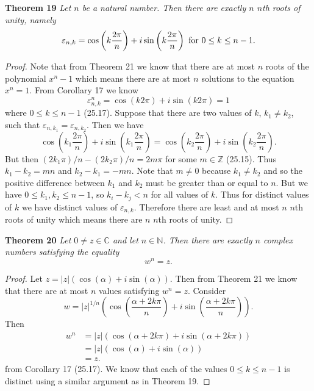 \documentclass{article}
\begin{document}
\begin{flushleft}
\textbf{Theorem 19}
\textsl{Let $n$ be a natural number. Then there are exactly $n$ $n$th roots of unity, namely
\[
\varepsilon_{n,k} = \cos \left ( k \frac{2 \pi}{n} \right ) + i \sin \left ( k \frac{2 \pi}{n} \right ) \textup{ for } 0 \leq k \leq n-1.
\]}
\begin{proof}
Note that from Theorem 21 we know that there are at most $n$ roots of the polynomial $x^n - 1$ which means there are at most $n$ solutions to the equation $x^n = 1$. From Corollary 17 we know
\[
\varepsilon_{n,k}^n = \cos \left ( k 2 \pi \right ) + i \sin \left ( k 2 \pi \right ) = 1
\]
where $0 \leq k \leq n-1$ (25.17). Suppose that there are two values of $k$, $k_1 \neq k_2$, such that $\varepsilon_{n,k_1} = \varepsilon_{n,k_2}$. Then we have
\[
\cos \left ( k_1 \frac{2 \pi}{n} \right ) + i \sin \left ( k_1 \frac{2 \pi}{n} \right ) = \cos \left ( k_2 \frac{2 \pi}{n} \right ) + i \sin \left ( k_2 \frac{2 \pi}{n} \right ).
\]
But then $(2 k_1 \pi)/n - (2 k_2 \pi)/n = 2 m \pi$ for some $m \in \mathbb{Z}$ (25.15). Thus $k_1 - k_2 = mn$ and $k_2 - k_1 = -mn$. Note that $m \neq 0$ because $k_1 \neq k_2$ and so the positive difference between $k_1$ and $k_2$ must be greater than or equal to $n$. But we have $0 \leq k_1, k_2 \leq n-1$, so $k_i - k_j < n$ for all values of $k$. Thus for distinct values of $k$ we have distinct values of $\varepsilon_{n,k}$. Therefore there are least and at most $n$ $n$th roots of unity which means there are $n$ $n$th roots of unity.
\end{proof}

\textbf{Theorem 20}
\textsl{Let $0 \neq z \in \mathbb{C}$ and let $n \in \mathbb{N}$. Then there are exactly $n$ complex numbers satisfying the equality
\[
w^n = z.
\]}
\begin{proof}
Let $z = |z| \left ( \cos \left (\alpha \right ) + i \sin \left ( \alpha \right ) \right )$. Then from Theorem 21 we know that there are at most $n$ values satisfying $w^n = z$. Consider
\[
w = |z|^{1/n} \left ( \cos \left ( \frac{\alpha + 2 k \pi}{n} \right ) + i \sin \left ( \frac{\alpha + 2 k \pi}{n} \right ) \right ).
\]
Then
\begin{align*}
w^n &= |z| \left ( \cos \left ( \alpha + 2k \pi \right ) + i \sin \left ( \alpha + 2k \pi \right ) \right )\\
	&= |z| \left ( \cos \left ( \alpha \right ) + i \sin \left ( \alpha \right ) \right ) \\
	&= z.
\end{align*}
from Corollary 17 (25.17). We know that each of the values $0 \leq k \leq n-1$ is distinct using a similar argument as in Theorem 19.
\end{proof}


\end{flushleft}
\end{document}
